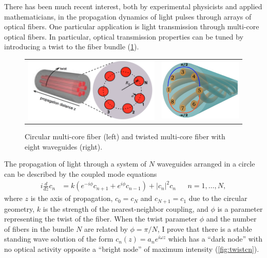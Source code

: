 \documentclass[12pt,reqno,oneside,hidelinks]{article}
\begin{document}
There has been much recent interest, both by experimental physicists and applied mathematicians, in the propagation dynamics of light pulses through arrays of optical fibers. One particular application is light transmission through multi-core optical fibers. In particular, optical transmission properties can be tuned by introducing a twist to the fiber bundle \cite{Longhi2016,CastroCastro2016,Parto2017} (\cref{fig:twist}).
\begin{figure}
\begin{center}
\begin{tabular}{cc}
\includegraphics[width=7cm]{images/twist2.png} &
\includegraphics[width=4.25cm]{images/twistmulticore.png}
\end{tabular}
\end{center}
\caption{Circular multi-core fiber \cite{Longhi2016} (left) and twisted multi-core fiber with eight waveguides \cite{Parto2017} (right).}
\label{fig:twist}
\end{figure}
The propagation of light through a system of $N$ waveguides arranged in a circle can be described by the coupled mode equations
\begin{align*}
i \frac{d}{dz} c_n &= k \left(e^{-i\phi}c_{n+1} + e^{i\phi}c_{n-1}\right) + |c_n|^2 c_n &&  n = 1, \dots, N,
\end{align*}
where $z$ is the axis of propagation, $c_0 = c_{N}$ and $c_{N+1} = c_1$ due to the circular geometry, $k$ is the strength of the nearest-neighbor coupling, and $\phi$ is a parameter representing the twist of the fiber.  When the twist parameter $\phi$ and the number of fibers in the bundle $N$ are related by $\phi = \pi/N$, I prove that there is a stable standing wave solution of the form $c_n(z) = a_n e^{i \omega z}$ which has a ``dark node'' with no optical activity opposite a ``bright node'' of maximum intensity \cite{ParkerTwist} (\cref{fig:twistcn}). 
\end{document}
